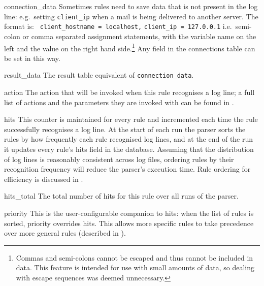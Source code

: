 \begin{boldeqlist}
    \item [connection\_data] Sometimes rules need to save data that is not
        present in the log line: e.g.\ setting \texttt{client\_ip} when a
        mail is being delivered to another server.  The format is:
        \newline{} \tab{} \texttt{ client\_hostname = localhost,}
        \newline{} \tab{} \tab{} \texttt{client\_ip = 127.0.0.1} \newline{}
        i.e.\ semi-colon or comma separated assignment statements, with the
        variable name on the left and the value on the right hand
        side.\footnote{Commas and semi-colons cannot be escaped and thus
        cannot be included in data.  This feature is intended for use with
        small amounts of data, so dealing with escape sequences was deemed
        unnecessary.}  Any field in the connections table can be set in
        this way.

    \item [result\_data] The result table equivalent of
        \texttt{connection\_data}.

    \item [action] The action that will be invoked when this rule
        recognises a log line; a full list of actions and the parameters
        they are invoked with can be found in .

    \item [hits] This counter is maintained for every rule and incremented
        each time the rule successfully recognises a log line.  At the
        start of each run the parser sorts the rules by how frequently each
        rule recognised log lines, and at the end of the run it updates
        every rule's hits field in the database.  Assuming that the
        distribution of log lines is reasonably consistent across log
        files, ordering rules by their recognition frequency will reduce
        the parser's execution time.  Rule ordering for efficiency is
        discussed in .

    \item [hits\_total] The total number of hits for this rule over all
        runs of the parser.

    \item [priority] This is the user-configurable companion to hits: when
        the list of rules is sorted, priority overrides hits.  This allows
        more specific rules to take precedence over more general rules
        (described in ).

\end{boldeqlist}

